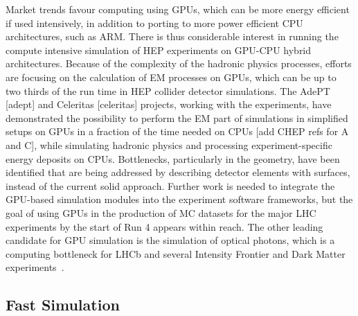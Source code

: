 \documentclass[10pt,a4paper]{article}
\begin{document}
Market trends favour computing using GPUs, which can be more energy
efficient if used intensively, in addition to porting to more power
efficient CPU architectures, such as ARM. There is thus considerable
interest in running the compute intensive simulation of HEP experiments
on GPU-CPU hybrid architectures. Because of the complexity of the
hadronic physics processes, efforts are focusing on the calculation of
EM processes on GPUs, which can be up to two thirds of the run time in
HEP collider detector simulations. The AdePT {[}adept{]} and Celeritas
{[}celeritas{]} projects, working with the experiments, have
demonstrated the possibility to perform the EM part of simulations in
simplified setups on GPUs in a fraction of the time needed on CPUs
{[}add CHEP refs for A and C{]}, while simulating hadronic physics and
processing experiment-specific energy deposits on CPUs. Bottlenecks,
particularly in the geometry, have been identified that are being
addressed by describing detector elements with surfaces, instead of the
current solid approach. Further work is needed to integrate the
GPU-based simulation modules into the experiment software frameworks,
but the goal of using GPUs in the production of MC datasets for the
major LHC experiments by the start of Run 4 appears within reach. The
other leading candidate for GPU simulation is the simulation of optical
photons, which is a computing bottleneck for LHCb and several Intensity
Frontier and Dark Matter
experiments~\cite{opticksCHEP}.

\subsection{Fast Simulation}\label{fast-simulation}
\end{document}
